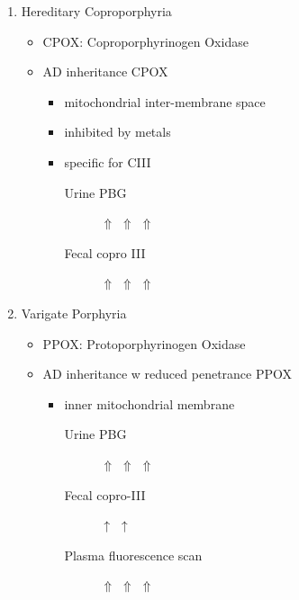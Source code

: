 \documentclass{scrartcl}
\begin{document}
\begin{enumerate}
\item Hereditary Coproporphyria
\label{sec:orgbe18397}
\begin{itemize}
\item CPOX: Coproporphyrinogen Oxidase
\item AD inheritance CPOX
\begin{itemize}
\item mitochondrial inter-membrane space
\item inhibited by metals
\item specific for CIII
\begin{description}
\item[{Urine PBG}] \(\Uparrow\) \(\Uparrow\) \(\Uparrow\)
\item[{Fecal copro III}] \(\Uparrow\) \(\Uparrow\) \(\Uparrow\)
\end{description}
\end{itemize}
\end{itemize}

\item Varigate Porphyria
\label{sec:org17546a6}
\begin{itemize}
\item PPOX: Protoporphyrinogen Oxidase
\item AD inheritance w reduced penetrance PPOX

\begin{itemize}
\item inner mitochondrial membrane
\begin{description}
\item[{Urine PBG}] \(\Uparrow\) \(\Uparrow\) \(\Uparrow\)
\item[{Fecal copro-III}] \(\uparrow\) \(\uparrow\)
\item[{Plasma fluorescence scan}] \(\Uparrow\) \(\Uparrow\) \(\Uparrow\)
\end{description}
\end{itemize}
\end{itemize}
\end{enumerate}
\end{document}
